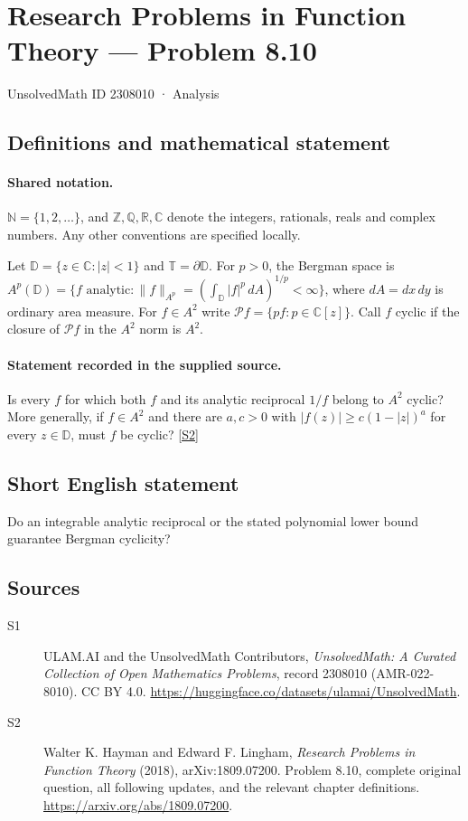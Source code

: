 \documentclass[11pt]{book}
\newcommand{\sref}[2]{\hyperlink{source:#1:#2}{[S#2]}}
\begin{document}
\setcounter{section}{2308009}
\section{Research Problems in Function Theory — Problem 8.10}\label{2308010}
{\small\sffamily UnsolvedMath ID 2308010 · Analysis}
\subsection{Definitions and mathematical statement}

\paragraph{Shared notation.}$\mathbb N=\{1,2,\ldots\}$, and $\mathbb Z,\mathbb Q,\mathbb R,\mathbb C$ denote the integers, rationals, reals and complex numbers. Any other conventions are specified locally.


Let $\mathbb D=\{z\in\mathbb C:|z|<1\}$ and $\mathbb T=\partial\mathbb D$. For $p>0$, the Bergman space is $A^p(\mathbb D)=\{f\text{ analytic}:\|f\|_{A^p}=(\int_{\mathbb D}|f|^p\,dA)^{1/p}<\infty\}$, where $dA=dx\,dy$ is ordinary area measure. For $f\in A^2$ write $\mathcal Pf=\{pf:p\in\mathbb C[z]\}$. Call $f$ cyclic if the closure of $\mathcal Pf$ in the $A^2$ norm is $A^2$.
\paragraph{Statement recorded in the supplied source.}
Is every $f$ for which both $f$ and its analytic reciprocal $1/f$ belong to $A^2$ cyclic? More generally, if $f\in A^2$ and there are $a,c>0$ with $|f(z)|\ge c(1-|z|)^a$ for every $z\in\mathbb D$, must $f$ be cyclic? \sref{2308010}{2}
\subsection{Short English statement}
Do an integrable analytic reciprocal or the stated polynomial lower bound guarantee Bergman cyclicity?
\subsection{Sources}
\begin{description}
\item[\hypertarget{source:2308010:1}{S1}] ULAM.AI and the UnsolvedMath Contributors, \emph{UnsolvedMath: A Curated Collection of Open Mathematics Problems}, record 2308010 (AMR-022-8010). CC BY 4.0. \url{https://huggingface.co/datasets/ulamai/UnsolvedMath}.
\item[\hypertarget{source:2308010:2}{S2}] Walter K. Hayman and Edward F. Lingham, \emph{Research Problems in Function Theory} (2018), arXiv:1809.07200. Problem 8.10, complete original question, all following updates, and the relevant chapter definitions. \url{https://arxiv.org/abs/1809.07200}.
\end{description}
\label{end:2308010}
\end{document}
